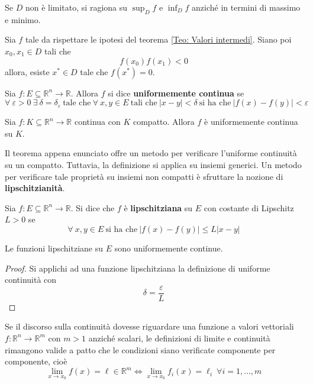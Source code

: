     \begin{oss}
        Se $D$ non è limitato, si ragiona su $\sup_{D}{f}$ e $\inf_{D}{f}$ anziché in termini di massimo e minimo.
    \end{oss}
\begin{corollary} \label{Teo: Teorema degli zeri}
    Sia $f$ tale da rispettare le ipotesi del teorema \ref{Teo: Valori intermedi}. Siano poi $x_0, x_1 \in D$ tali che 
    \begin{equation}
        f(x_0)f(x_1) < 0
    \end{equation}
    allora, esiste $x^* \in D$ tale che $f(x^*)=0$.
\end{corollary}
\begin{definition} \label{Def: Uniforme continuità}
    Sia $f:E \subseteq \mathbb{R}^n \to \mathbb{R}$. Allora $f$ si dice \textbf{uniformemente continua} se
    \begin{equation}
        \forall\ \varepsilon >0 \ \exists\ \delta=\delta_\varepsilon\ \text{tale che}\ \forall\ x, y \in E\ \text{tali che}\ |x-y|<\delta\ \text{si ha che}\ |f(x)-f(y)| < \varepsilon
    \end{equation}
\end{definition}
\begin{theorem} \label{Teo: Heine Cantor}
    Sia $f: K \subseteq \mathbb{R}^n \to \mathbb{R}$ continua con $K$ compatto. Allora $f$ è uniformemente continua su $K$.
\end{theorem}
Il teorema appena enunciato offre un metodo per verificare l'uniforme continuità su un compatto. Tuttavia, la definizione si applica su insiemi generici. Un metodo per verificare tale proprietà su insiemi non compatti è sfruttare la nozione di \textbf{lipschitzianità}.
\begin{definition} \label{Def: Funzione lipschitziana}
    Sia $f:E \subseteq \mathbb{R}^n \to \mathbb{R}$. Si dice che $f$ è \textbf{lipschitziana} su $E$ con costante di Lipschitz $L>0$ se
    \begin{equation}
        \forall\ x,y \in E\ \text{si ha che}\ |f(x)-f(y)| \leq L|x-y|
    \end{equation}
\end{definition}
\begin{proposition}
    Le funzioni lipschitziane su $E$ sono uniformemente continue.
\end{proposition}
    \begin{proof}
        Si applichi ad una funzione lipschitziana la definizione di uniforme continuità con 
        \begin{equation}
            \delta= \frac{\varepsilon}{L}
        \end{equation}
    \end{proof}
Se il discorso sulla continuità dovesse riguardare una funzione a valori vettoriali $f: \mathbb{R}^n \to \mathbb{R}^m$ con $m>1$ anziché scalari, le definizioni di limite e continuità rimangono valide a patto che le condizioni siano verificate componente per componente, cioè
\begin{equation}
    \lim_{x \to x_0}{f(x)}=\ell \in \mathbb{R}^m \iff \lim_{x \to x_0}{f_i(x)}=\ell_i\ \forall i=1, \dots, m
\end{equation}
